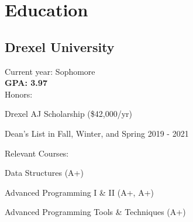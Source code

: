 \documentclass[]{deedy-resume-openfont}
\begin{document}
%
%

%
%

%
%

\begin{minipage}[t]{0.33\textwidth}


    \section{Education}
    \subsection{Drexel University}
    Current year: Sophomore \\
    \textbf{GPA: 3.97} \\
    \vspace{\topsep}
    Honors:
    \vspace{\topsep} %
    \begin{tightemize}
        \item Drexel AJ Scholarship (\$42,000/yr)
        \item Dean's List in Fall, Winter, and Spring 2019 - 2021
    \end{tightemize}
    Relevant Courses: \\
    \begin{tightemize}
        \item Data Structures (A+)
        \item Advanced Programming I \& II (A+, A+)
        \item Advanced Programming Tools \& Techniques (A+)
    \end{tightemize}
    \sectionsep


\end{minipage}
\end{document}
